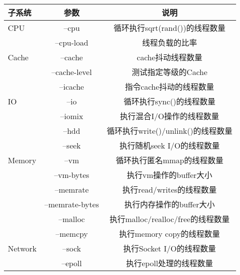 \begin{table}
    \label{tab:arg_list}
    \footnotesize%
    \setlength{\tabcolsep}{4pt}%
    \renewcommand{\arraystretch}{1.5}%
    \centering
    \begin{tabular}{lcc}
        \hline
        子系统 & 参数 & 说明\\
        \hline
        CPU	    & --cpu	& 循环执行sqrt(rand())的线程数量\\
	            & --cpu-load & 线程负载的比率\\
        Cache	& --cache & cache抖动线程数量\\
	    & --cache-level	&测试指定等级的Cache\\
	    & --icache	&指令cache抖动的线程数量\\
        IO	    & --io	&循环执行sync()的线程数量\\
	            & --iomix	&执行混合I/O操作的线程数量\\
	            & --hdd	&循环执行write()/unlink()的线程数量\\
	            & --seek	&执行随机seek I/O的线程数量\\
        Memory	& --vm	&循环执行匿名mmap的线程数量\\
	            & --vm-bytes	&执行vm操作的buffer大小\\
	            & --memrate	&执行read/writes的线程数量\\
	            & --memrate-bytes	&执行内存操作的buffer大小\\
	            & --malloc	&执行malloc/realloc/free的线程数量\\
	            & --memcpy	&执行memory copy的线程数量\\
        Network	& --sock	&执行Socket I/O的线程数量\\
	            & --epoll	&执行epoll处理的线程数量\\
        \hline
    \end{tabular}
\end{table}





